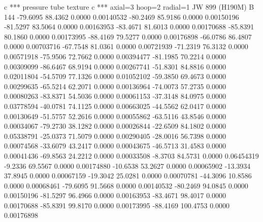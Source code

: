 c *** pressure tube texture
c ***  axial=3  hoop=2   radial=1
    JW 899 (H190M)
B   144
    -79.6095      88.4362       0.0000           0.00140532
    -80.2469      85.9186       0.0000           0.00150196
    -81.5297      83.5064       0.0000           0.00163953
    -83.4671      81.6013       0.0000           0.00170688
    -85.8391      80.1860       0.0000           0.00173995
    -88.4169      79.5277       0.0000           0.00176898
    -66.0786      86.4807       0.0000           0.00703716
    -67.7548      81.0361       0.0000           0.00721939
    -71.2319      76.3132       0.0000           0.00571918
    -75.9506      72.7662       0.0000           0.00394477
    -81.1985      70.2214       0.0000           0.00309099
    -86.6467      68.9194       0.0000           0.00267741
    -51.8301      84.8816       0.0000           0.02011804
    -54.5709      77.1326       0.0000           0.01052102
    -59.3850      69.4673       0.0000           0.00299635
    -65.5214      62.2071       0.0000           0.00136964
    -74.0073      57.2735       0.0000           0.00080263
    -83.8371      54.5036       0.0000           0.00061153
    -37.3148      84.0975       0.0000           0.03778594
    -40.0781      74.1125       0.0000           0.00663025
    -44.5562      62.0417       0.0000           0.00130649
    -51.5757      52.2616       0.0000           0.00055862
    -63.5116      43.8546       0.0000           0.00034067
    -79.2730      38.1282       0.0000           0.00026844
    -22.6509      84.1802       0.0000           0.05338791
    -25.0373      71.5079       0.0000           0.00290405
    -28.0016      56.7398       0.0000           0.00074568
    -33.6079      43.2417       0.0000           0.00043675
    -46.5713      31.4583       0.0000           0.00041436
    -69.8563      24.2212       0.0000           0.00033508
     -8.3703      84.5731       0.0000           0.06454319
     -9.2336      69.5567       0.0000           0.00174880
    -10.6538      53.2627       0.0000           0.00065902
    -13.3934      37.8945       0.0000           0.00067159
    -19.3042      25.0281       0.0000           0.00070781
    -44.3096      10.8586       0.0000           0.00068461
    -79.6095      91.5668       0.0000           0.00140532
    -80.2469      94.0845       0.0000           0.00150196
    -81.5297      96.4966       0.0000           0.00163953
    -83.4671      98.4017       0.0000           0.00170688
    -85.8391      99.8170       0.0000           0.00173995
    -88.4169     100.4753       0.0000           0.00176898
